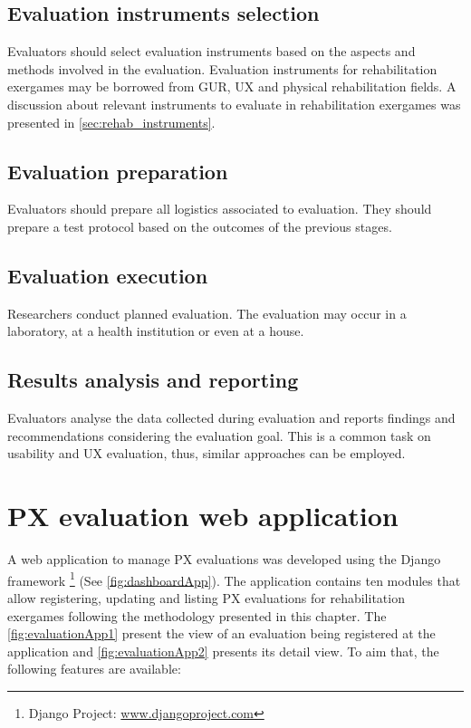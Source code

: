 \subsection{Evaluation instruments selection}
Evaluators should select evaluation instruments based on the aspects and methods involved in the evaluation. Evaluation instruments for rehabilitation exergames may be borrowed from \ac{GUR}, \ac{UX} and physical rehabilitation fields. A discussion about relevant instruments to evaluate in rehabilitation exergames was presented in \autoref{sec:rehab_instruments}.

\subsection{Evaluation preparation}
Evaluators should prepare all logistics associated to evaluation. They should prepare a test protocol based on the outcomes of the previous stages.

\subsection{Evaluation execution}
Researchers conduct planned evaluation. The evaluation may occur in a laboratory, at a health institution or even at a house.

\subsection{Results analysis and reporting}
Evaluators analyse the data collected during evaluation and reports findings and recommendations considering the evaluation goal. This is a common task on usability and UX evaluation, thus, similar approaches can be employed.










\section{PX evaluation web application}
A web application to manage \ac{PX} evaluations was developed using the Django framework \footnote{Django Project: \url{www.djangoproject.com}} (See \autoref{fig:dashboardApp}). The application contains ten modules that allow registering, updating and listing \ac{PX} evaluations for rehabilitation exergames following the methodology presented in this chapter. The \autoref{fig:evaluationApp1} present the view of an evaluation being registered at the application and \autoref{fig:evaluationApp2} presents its detail view. To aim that, the following features are available:

